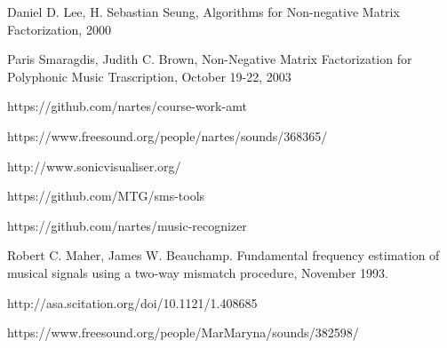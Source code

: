\documentclass[oneside, final, 12pt]{extarticle}
\begin{document}
\begin{thebibliography}{0}






   Daniel D. Lee, H. Sebastian Seung,
  Algorithms for Non-negative Matrix Factorization, 2000

   Paris Smaragdis, Judith C. Brown,
    Non-Negative Matrix Factorization
    for Polyphonic Music Trascription, October 19-22, 2003







   https://github.com/nartes/course-work-amt

   https://www.freesound.org/people/nartes/sounds/368365/ 

   http://www.sonicvisualiser.org/

   https://github.com/MTG/sms-tools

   https://github.com/nartes/music-recognizer

   Robert C. Maher, James W. Beauchamp.
    Fundamental frequency estimation of musical signals
    using a two-way mismatch procedure, November 1993.

    http://asa.scitation.org/doi/10.1121/1.408685

    https://www.freesound.org/people/MarMaryna/sounds/382598/

\end{thebibliography}
\end{document}
